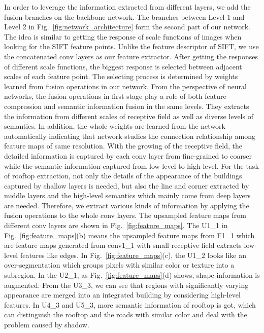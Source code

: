 In order to leverage the information extracted from different layers, we add the fusion branches on the backbone network.
The branches between Level 1 and Level 2 in Fig.~\ref{fig:network_architecture} form the second part of our network.
The idea is similar to getting the response of scale functions of images when looking for the SIFT feature points. Unlike the feature descriptor of SIFT, we use the concatenated conv layers as our feature extractor.
After getting the responses of different scale functions, the biggest response is selected between adjacent scales of each feature point.
The selecting process is determined by weights learned from fusion operations in our network.
From the perspective of neural networks, the fusion operations in first stage play a role of both feature compression and semantic information fusion in the same levels. They extracts the information from different scales of receptive field as well as diverse levels of semantics.
In addition, the whole weights are learned from the network automatically indicating that network studies the connection relationship among feature maps of same resolution.
With the growing of the receptive field, the detailed information is captured by each conv layer from fine-grained to coarser while the semantic information captured from low level to high level.
For the task of rooftop extraction, not only the details of the appearance of the buildings captured by shallow layers is needed, but also the line and corner extracted by middle layers and the high-level semantics which mainly come from deep layers are needed.
Therefore, we extract various kinds of information by applying the fusion operations to the whole conv layers.
The upsampled feature maps from different conv layers are shown in Fig.~\ref{fig:feature_maps}.
The U1\_1 in Fig.~\ref{fig:feature_maps}(b) means the upsampled feature maps from F1\_1 which are feature maps generated from conv1\_1 with small receptive field extracts low-level features like edges.
In Fig.~\ref{fig:feature_maps}(c), the U1\_2 looks like an over-segmentation which groups pixels with similar color or texture into a subregion.
In the U2\_1, as Fig.~\ref{fig:feature_maps}(d) shows, shape information is augmented.
From the U3\_3, we can see that regions with significantly varying appearance are merged into an integrated building by considering high-level features.
In U4\_3 and U5\_3, more semantic information of rooftop is got, which can distinguish the rooftop and the roads with similar color and deal with the problem caused by shadow.
%

